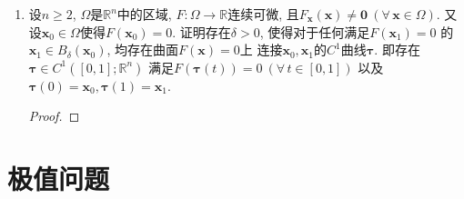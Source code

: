 \begin{1b}
\begin{enumerate}
\item 设\(n\geqslant 2\), \(\varOmega\)是\(\mathbb{R}^n\)中的区域, 
\(F:\varOmega\rightarrow\mathbb{R}\)连续可微, 
且\(F_{\boldsymbol{x}}(\boldsymbol{x})
\ne\boldsymbol{0}\ (\forall\,\boldsymbol{x}\in\varOmega)\). 
又设\(\boldsymbol{x}_0\in\varOmega\)使得\(F(\boldsymbol{x}_0)=0\). 
证明存在\(\delta>0\), 使得对于任何满足\(F(\boldsymbol{x}_1)=0\)
的\(\boldsymbol{x}_1\in B_\delta(\boldsymbol{x}_0)\), 
均存在曲面\(F(\boldsymbol{x})=0\)上
连接\(\boldsymbol{x}_0,\boldsymbol{x}_1\)的\(C^1\)曲线\(\boldsymbol{\tau}\). 
即存在\(\boldsymbol{\tau}\in C^1([0,1];\mathbb{R}^n)\)
满足\(F(\boldsymbol{\tau}(t))=0\ (\forall\, t\in[0,1])\)
以及\(\boldsymbol{\tau}(0)=\boldsymbol{x}_0,\boldsymbol{\tau}(1)=\boldsymbol{x}_1\).
\begin{proof}
	
\end{proof}
\end{enumerate}
\end{1b}

\section{极值问题}
